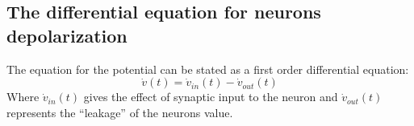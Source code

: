 %
%
%
%









\subsection{The differential equation for neurons depolarization} 
The equation for the potential can be stated as a first order differential equation:
\begin{equation}
	\dot{v}(t) = \dot{v}_{in}(t) - \dot{v}_{out}(t) %
\end{equation}
Where $\dot{v}_{in}(t)$ gives the effect of synaptic input to the neuron and $\dot{v}_{out}(t)$ represents the ``leakage'' of the neurons value.



